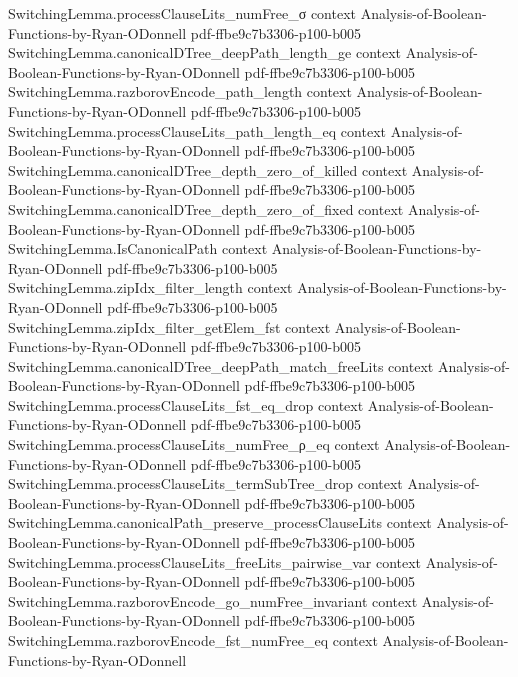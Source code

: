 \begin{theorem}
\proofstep
  {SwitchingLemma.processClauseLits_numFree_σ}
  {context}
  {Analysis-of-Boolean-Functions-by-Ryan-ODonnell}
  {pdf-ffbe9c7b3306-p100-b005}
\proofstep
  {SwitchingLemma.canonicalDTree_deepPath_length_ge}
  {context}
  {Analysis-of-Boolean-Functions-by-Ryan-ODonnell}
  {pdf-ffbe9c7b3306-p100-b005}
\proofstep
  {SwitchingLemma.razborovEncode_path_length}
  {context}
  {Analysis-of-Boolean-Functions-by-Ryan-ODonnell}
  {pdf-ffbe9c7b3306-p100-b005}
\proofstep
  {SwitchingLemma.processClauseLits_path_length_eq}
  {context}
  {Analysis-of-Boolean-Functions-by-Ryan-ODonnell}
  {pdf-ffbe9c7b3306-p100-b005}
\proofstep
  {SwitchingLemma.canonicalDTree_depth_zero_of_killed}
  {context}
  {Analysis-of-Boolean-Functions-by-Ryan-ODonnell}
  {pdf-ffbe9c7b3306-p100-b005}
\proofstep
  {SwitchingLemma.canonicalDTree_depth_zero_of_fixed}
  {context}
  {Analysis-of-Boolean-Functions-by-Ryan-ODonnell}
  {pdf-ffbe9c7b3306-p100-b005}
\proofstep
  {SwitchingLemma.IsCanonicalPath}
  {context}
  {Analysis-of-Boolean-Functions-by-Ryan-ODonnell}
  {pdf-ffbe9c7b3306-p100-b005}
\proofstep
  {SwitchingLemma.zipIdx_filter_length}
  {context}
  {Analysis-of-Boolean-Functions-by-Ryan-ODonnell}
  {pdf-ffbe9c7b3306-p100-b005}
\proofstep
  {SwitchingLemma.zipIdx_filter_getElem_fst}
  {context}
  {Analysis-of-Boolean-Functions-by-Ryan-ODonnell}
  {pdf-ffbe9c7b3306-p100-b005}
\proofstep
  {SwitchingLemma.canonicalDTree_deepPath_match_freeLits}
  {context}
  {Analysis-of-Boolean-Functions-by-Ryan-ODonnell}
  {pdf-ffbe9c7b3306-p100-b005}
\proofstep
  {SwitchingLemma.processClauseLits_fst_eq_drop}
  {context}
  {Analysis-of-Boolean-Functions-by-Ryan-ODonnell}
  {pdf-ffbe9c7b3306-p100-b005}
\proofstep
  {SwitchingLemma.processClauseLits_numFree_ρ_eq}
  {context}
  {Analysis-of-Boolean-Functions-by-Ryan-ODonnell}
  {pdf-ffbe9c7b3306-p100-b005}
\proofstep
  {SwitchingLemma.processClauseLits_termSubTree_drop}
  {context}
  {Analysis-of-Boolean-Functions-by-Ryan-ODonnell}
  {pdf-ffbe9c7b3306-p100-b005}
\proofstep
  {SwitchingLemma.canonicalPath_preserve_processClauseLits}
  {context}
  {Analysis-of-Boolean-Functions-by-Ryan-ODonnell}
  {pdf-ffbe9c7b3306-p100-b005}
\proofstep
  {SwitchingLemma.processClauseLits_freeLits_pairwise_var}
  {context}
  {Analysis-of-Boolean-Functions-by-Ryan-ODonnell}
  {pdf-ffbe9c7b3306-p100-b005}
\proofstep
  {SwitchingLemma.razborovEncode_go_numFree_invariant}
  {context}
  {Analysis-of-Boolean-Functions-by-Ryan-ODonnell}
  {pdf-ffbe9c7b3306-p100-b005}
\proofstep
  {SwitchingLemma.razborovEncode_fst_numFree_eq}
  {context}
  {Analysis-of-Boolean-Functions-by-Ryan-ODonnell}

\end{theorem}
